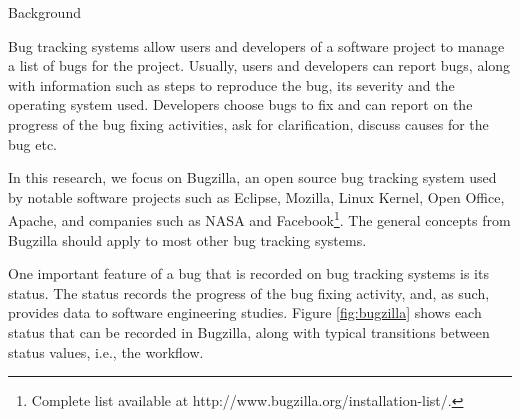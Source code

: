 \begin{section}{Background} \label{sec:background}


Bug tracking systems allow users and developers of a software project to manage a list of bugs for the project. Usually, users and developers can report bugs, along with information such as steps to reproduce the bug, its severity and the operating system used. Developers choose bugs to fix and can report on the progress of the bug fixing activities, ask for clarification, discuss causes for the bug etc.

In this research, we focus on Bugzilla, an open source bug tracking system used by notable software projects such as Eclipse, Mozilla, Linux Kernel, Open Office, Apache, and companies such as NASA and Facebook\footnote{Complete list available at http://www.bugzilla.org/installation-list/.}. The general concepts from Bugzilla should apply to most other bug tracking systems.

One important feature of a bug that is recorded on bug tracking systems is its status. The status records the progress of the bug fixing activity, and, as such, provides data to software engineering studies. Figure \ref{fig:bugzilla} shows each status that can be recorded in Bugzilla, along with typical transitions between status values, i.e., the workflow.


\end{section}
